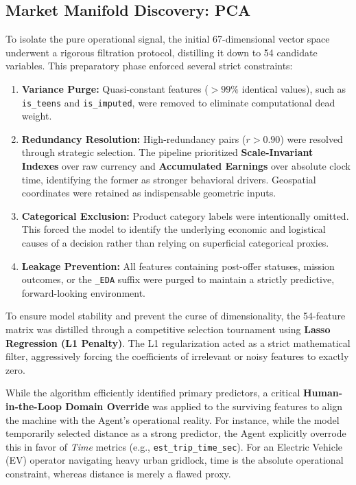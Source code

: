 \subsection{Market Manifold Discovery: PCA}
To isolate the pure operational signal, the initial 67-dimensional vector space underwent a rigorous filtration protocol, distilling it down to 54 candidate variables. This preparatory phase enforced several strict constraints:

\begin{enumerate}[noitemsep, topsep=3pt]
    \item \textbf{Variance Purge:} Quasi-constant features ($>99\%$ identical values), such as \texttt{is\_teens} and \texttt{is\_imputed}, were removed to eliminate computational dead weight.
    
    \item \textbf{Redundancy Resolution:} High-redundancy pairs ($r > 0.90$) were resolved through strategic selection. The pipeline prioritized \textbf{Scale-Invariant Indexes} over raw currency and \textbf{Accumulated Earnings} over absolute clock time, identifying the former as stronger behavioral drivers. Geospatial coordinates were retained as indispensable geometric inputs.
    
    \item \textbf{Categorical Exclusion:} Product category labels were intentionally omitted. This forced the model to identify the underlying economic and logistical causes of a decision rather than relying on superficial categorical proxies.
    
    \item \textbf{Leakage Prevention:} All features containing post-offer statuses, mission outcomes, or the \texttt{\_EDA} suffix were purged to maintain a strictly predictive, forward-looking environment.
\end{enumerate}

To ensure model stability and prevent the curse of dimensionality, the 54-feature matrix was distilled through a competitive selection tournament using \textbf{Lasso Regression (L1 Penalty)}. The L1 regularization acted as a strict mathematical filter, aggressively forcing the coefficients of irrelevant or noisy features to exactly zero.

While the algorithm efficiently identified primary predictors, a critical \textbf{Human-in-the-Loop Domain Override} was applied to the surviving features to align the machine with the Agent's operational reality. For instance, while the model temporarily selected distance as a strong predictor, the Agent explicitly overrode this in favor of \textit{Time} metrics (e.g., \texttt{est\_trip\_time\_sec}). For an Electric Vehicle (EV) operator navigating heavy urban gridlock, time is the absolute operational constraint, whereas distance is merely a flawed proxy. 

